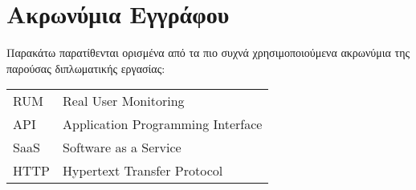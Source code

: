 \chapter*{Ακρωνύμια Εγγράφου}
\label{append:acronyms}
{}

Παρακάτω παρατίθενται ορισμένα από τα πιο συχνά χρησιμοποιούμενα ακρωνύμια της
παρούσας διπλωματικής εργασίας:

\begin{table}[htpb]
  \centering
  \begin{tabular}{l@{$\;\;\longrightarrow\;\;$}l}
	RUM & Real User Monitoring \\
  API & Application Programming Interface \\
  SaaS & Software as a Service \\
  HTTP & Hypertext Transfer Protocol \\
  \end{tabular}
\end{table}